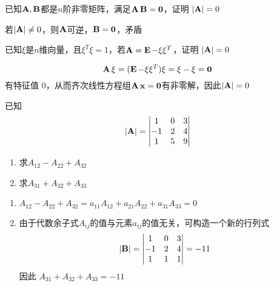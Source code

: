 \documentclass{article}
\begin{document}
\begin{examplle}[]
已知\(\operatorname{\textbf{A}},\operatorname{\textbf{B}}\)都是\(n\)阶非零矩阵，满足\(\operatorname{\textbf{A}}\operatorname{\textbf{B}}=\mathbf{0}\)，证明
\(\abs{\bA}=0\)

若\(\abs{\bA}\neq0\)，则\(\operatorname{\textbf{A}}\)可逆，\(\operatorname{\textbf{B}}=\mathbf{0}\)，矛盾
\end{examplle}

\begin{examplle}[]
已知\(\xi\)是\(n\)维向量，且\(\xi^T\xi=1\)，若\(\operatorname{\textbf{A}}=\operatorname{\textbf{E}}-\xi\xi^T\)，证明
\(\abs{\bA}=0\)

\begin{equation*}
\operatorname{\textbf{A}}\xi=(\operatorname{\textbf{E}}-\xi\xi^T)\xi=\xi-\xi=\mathbf{0}
\end{equation*}
有特征值 0，从而齐次线性方程组\(\operatorname{\textbf{A}}\operatorname{\textbf{x}}=\mathbf{0}\)有非零解，因此\(\abs{\bA}=0\)
\end{examplle}


\begin{examplle}[]
已知
\begin{equation*}
\abs{\bA}=
\begin{vmatrix}
1&0&3\\-1&2&4\\1&5&9
\end{vmatrix}
\end{equation*}
\begin{enumerate}
\item 求\(A_{12}-A_{22}+A_{32}\)
\item 求\(A_{31}+A_{32}+A_{33}\)
\end{enumerate}


\begin{enumerate}
\item \(A_{12}-A_{22}+A_{32}=a_{11}A_{12}+a_{21}A_{22}+a_{31}A_{33}=0\)
\item 由于代数余子式\(A_{ij}\)的值与元素\(a_{ij}\)的值无关，可构造一个新的行列式
\begin{equation*}
\abs{\bB}=
\begin{vmatrix}
1&0&3\\-1&2&4\\1&1&1
\end{vmatrix}=-11
\end{equation*}
因此 \(A_{31}+A_{32}+A_{33}=-11\)
\end{enumerate}
\end{examplle}
\end{document}
